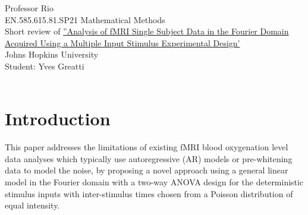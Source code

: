 \documentclass[12pt,twoside]{article}
\begin{document}
\noindent Professor Rio\\
EN.585.615.81.SP21 Mathematical Methods\\
Short review of \href{https://blackboard.jhu.edu/courses/1/EN.585.615.81.SP21/db/_11111758_1/JSIP20120400006_16101005.pdf}{''Analysis of fMRI Single Subject Data in the Fourier Domain Acquired Using a Multiple Input Stimulus Experimental Design'} \\
Johns Hopkins University\\
Student: Yves Greatti\\\

\section*{Introduction}
This paper addresses the limitations of existing fMRI blood oxygenation level data analyses which typically use autoregressive (AR) models 
or pre-whitening data to model the noise, by proposing a novel approach using a general linear model in the Fourier domain
with a two-way ANOVA design for the deterministic stimulus inputs with inter-stimulus times chosen from a Poisson distribution of equal intensity.
\end{document}
